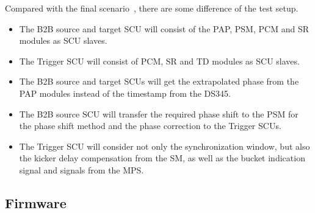 Compared with the final scenario~\cite{bai_concept_2016}, there are some difference of the test setup.
\begin{itemize}
\item
The B2B source and target SCU will consist of the PAP, PSM, PCM and SR modules as SCU slaves. 
\item
The Trigger SCU will consist of PCM, SR and TD modules as SCU slaves. 
\item 
The B2B source and target SCUs will get the extrapolated phase from the PAP modules instead of the timestamp from the DS345. 
\item 
The B2B source SCU will transfer the required phase shift to the PSM for the phase shift method and the phase correction to the Trigger SCUs.
\item 
The Trigger SCU will consider not only the synchronization window, but also the kicker delay compensation from the SM, as well as the bucket indication signal and signals from the MPS.
\end{itemize}

\subsection{Firmware}

